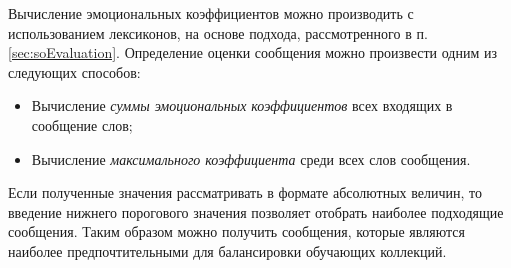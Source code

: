     Вычисление эмоциональных коэффициентов можно производить
    с использованием лексиконов, на основе подхода, рассмотренного в п. \ref{sec:soEvaluation}.
    Определение оценки сообщения можно произвести одним из следующих способов:
    \begin{itemize}
        \item Вычисление {\it суммы эмоциональных коэффициентов} всех входящих в сообщение слов;
        \item Вычисление {\it максимального коэффициента} среди всех слов сообщения.
    \end{itemize}

    Если полученные значения рассматривать в формате абсолютных величин, то
    введение нижнего порогового значения позволяет отобрать наиболее подходящие
    сообщения. Таким образом можно получить сообщения, которые являются
    наиболее предпочтительными для балансировки обучающих коллекций.
